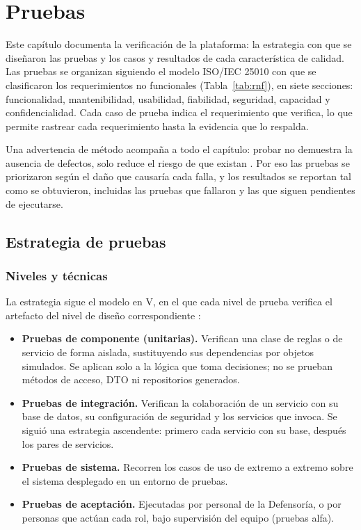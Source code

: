 \chapter{Pruebas}
	\label{cap:pruebas}
	Este capítulo documenta la verificación de la plataforma: la estrategia con que se diseñaron las
	pruebas y los casos y resultados de cada característica de calidad. Las pruebas se organizan siguiendo el modelo ISO/IEC 25010 \cite{iso25010} con que se
	clasificaron los requerimientos no funcionales (Tabla~\ref{tab:rnf}), en siete secciones:
	funcionalidad, mantenibilidad, usabilidad, fiabilidad, seguridad, capacidad y confidencialidad. Cada
	caso de prueba indica el requerimiento que verifica, lo que permite rastrear cada requerimiento
	hasta la evidencia que lo respalda.

	Una advertencia de método acompaña a todo el capítulo: probar no demuestra la ausencia de defectos,
	solo reduce el riesgo de que existan \cite{myers_testing}. Por eso las pruebas se priorizaron según
	el daño que causaría cada falla, y los resultados se reportan tal como se obtuvieron, incluidas las
	pruebas que fallaron y las que siguen pendientes de ejecutarse.

	\section{Estrategia de pruebas}
	\label{sec:estrategia_pruebas}
	\subsection{Niveles y técnicas}
	La estrategia sigue el modelo en V, en el que cada nivel de prueba verifica el artefacto del nivel de
	diseño correspondiente \cite{istqb_foundation}:

	\begin{itemize}
		\item \textbf{Pruebas de componente (unitarias).} Verifican una clase de reglas o de servicio de
		forma aislada, sustituyendo sus dependencias por objetos simulados. Se aplican solo a la lógica que
		toma decisiones; no se prueban métodos de acceso, DTO ni repositorios generados.
		\item \textbf{Pruebas de integración.} Verifican la colaboración de un servicio con su base de
		datos, su configuración de seguridad y los servicios que invoca. Se siguió una estrategia
		ascendente: primero cada servicio con su base, después los pares de servicios.
		\item \textbf{Pruebas de sistema.} Recorren los casos de uso de extremo a extremo sobre el sistema
		desplegado en un entorno de pruebas.
		\item \textbf{Pruebas de aceptación.} Ejecutadas por personal de la Defensoría, o por personas que
		actúan cada rol, bajo supervisión del equipo (pruebas alfa).
	\end{itemize}

